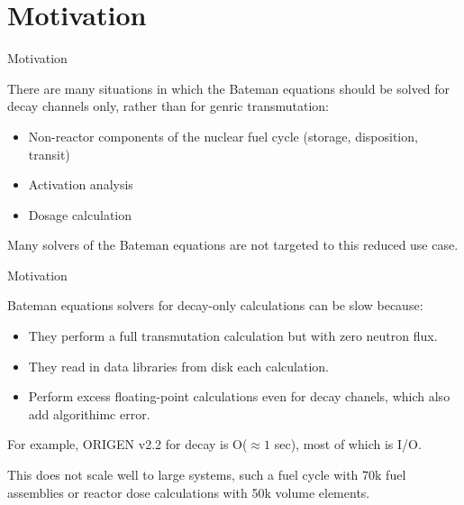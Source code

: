 \documentclass[xcolor=x11names,compress]{beamer}
\begin{document}
\section{Motivation}
\begin{frame}{Motivation}

    There are many situations in which the Bateman equations 
    \cite{bateman1910solution} should be solved for decay channels only, 
    rather than for genric transmutation:
    
    \vspace*{1em}
    \begin{itemize}
        \item Non-reactor components of the nuclear fuel cycle (storage, 
              disposition, transit)
        \item Activation analysis
        \item Dosage calculation
    \end{itemize}

    \vspace*{1em}
    Many solvers of the Bateman equations are not targeted to this reduced 
    use case.

\end{frame}

\begin{frame}{Motivation}

    Bateman equations solvers for decay-only calculations can be slow because:
    
    \vspace*{1em}
    \begin{itemize}
        \item They perform a full transmutation calculation but with zero
              neutron flux.
        \item They read in data libraries from disk each calculation.
        \item Perform excess floating-point calculations even for decay
              chanels, which also add algorithimc error.
    \end{itemize}

    For example, ORIGEN v2.2 for decay is O($\approx 1$ sec), most of which is
    I/O.

    \vspace*{1em}
    This does not scale well to large systems, such a fuel cycle with 70k 
    fuel assemblies or reactor dose calculations with 50k volume elements.

\end{frame}
\end{document}
